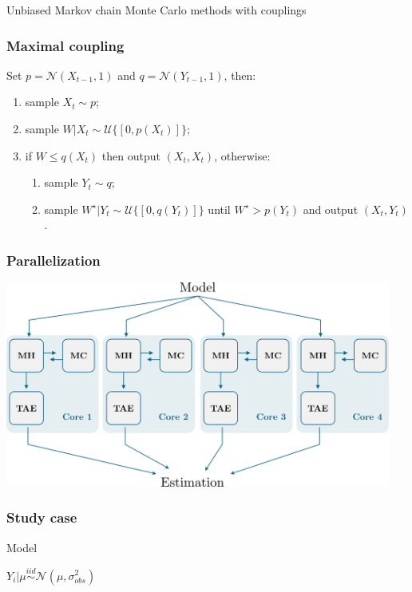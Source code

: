 \documentclass{beamer}
\begin{document}
\begin{section}{Unbiased Markov chain Monte Carlo methods with couplings}
\begin{frame}
\begin{enumerate}
			\end{enumerate}
	\end{frame}


	\begin{frame}
		\frametitle{Maximal coupling}
		Set $p = \mathcal{N}(X_{t-1},1)$ and $q = \mathcal{N}(Y_{t-1},1)$, then:
		\begin{enumerate}
			\item sample $X_t \sim p$;
			\item sample $W|X_t \sim \mathcal{U}\{[0,p(X_t)]\}$;
			\item if $W\leq q(X_t)$ then output $(X_t,X_t)$, otherwise:
			\begin{enumerate}
				\item sample $Y_t \sim q$;
				\item sample $W^\star | Y_t \sim \mathcal{U}\{[0, q(Y_t)]\}$ 
				until $W^\star > p(Y_t)$ and output $(X_t,Y_t)$.
			\end{enumerate}
		\end{enumerate}
	\end{frame}

	\begin{frame}
		\frametitle{Parallelization}
		\begin{center}
			\includegraphics[width=0.95\textwidth]{img/Bayes2}
		\end{center}
	\end{frame}


	\begin{frame}
		\frametitle{Study case}
		
		\begin{block}{Model}
			\begin{center}
				$ Y_i | \mu \overset{iid}{\sim} \mathcal{N}(\mu, \sigma_{obs} ^2) $\\
				
				\vspace{0.3cm}
				

\end{center}
\end{block}
\end{frame}
\end{section}
\end{document}
